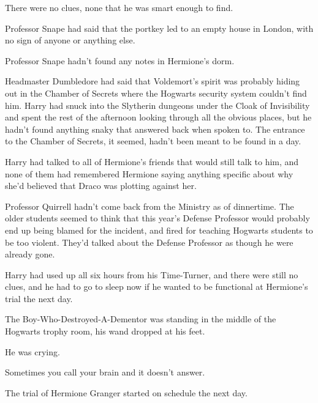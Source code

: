 There were no clues, none that he was smart enough to find.

Professor Snape had said that the portkey led to an empty house in
London, with no sign of anyone or anything else.

Professor Snape hadn't found any notes in Hermione's dorm.

Headmaster Dumbledore had said that Voldemort's spirit was probably
hiding out in the Chamber of Secrets where the Hogwarts security system
couldn't find him. Harry had snuck into the Slytherin dungeons under the
Cloak of Invisibility and spent the rest of the afternoon looking
through all the obvious places, but he hadn't found anything snaky that
answered back when spoken to. The entrance to the Chamber of Secrets, it
seemed, hadn't been meant to be found in a day.

Harry had talked to all of Hermione's friends that would still talk to
him, and none of them had remembered Hermione saying anything specific
about why she'd believed that Draco was plotting against her.

Professor Quirrell hadn't come back from the Ministry as of dinnertime.
The older students seemed to think that this year's Defense Professor
would probably end up being blamed for the incident, and fired for
teaching Hogwarts students to be too violent. They'd talked about the
Defense Professor as though he were already gone.

Harry had used up all six hours from his Time-Turner, and there were
still no clues, and he had to go to sleep now if he wanted to be
functional at Hermione's trial the next day.

The Boy-Who-Destroyed-A-Dementor was standing in the middle of the
Hogwarts trophy room, his wand dropped at his feet.

He was crying.

Sometimes you call your brain and it doesn't answer.

The trial of Hermione Granger started on schedule the next day.
